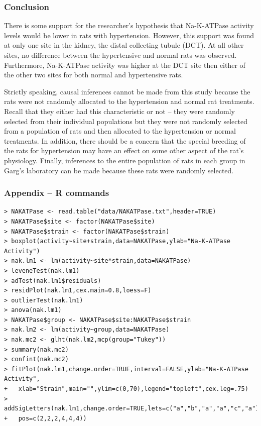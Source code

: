\documentclass[10pt,openany]{book}\usepackage[]{graphicx}\usepackage[]{color}
\begin{document}
\subsubsection*{Conclusion}
There is some support for the researcher's hypothesis that Na-K-ATPase activity levels would be lower in rats with hypertension.  However, this support was found at only one site in the kidney, the distal collecting tubule (DCT).  At all other sites, no difference between the hypertensive and normal rats was observed.  Furthermore, Na-K-ATPase activity was higher at the DCT site then either of the other two sites for both normal and hypertensive rats.

Strictly speaking, causal inferences cannot be made from this study because the rats were not randomly allocated to the hypertension and normal rat treatments.  Recall that they either had this characteristic or not -- they were randomly selected from their individual populations but they were not randomly selected from a population of rats and then allocated to the hypertension or normal treatments.  In addition, there should be a concern that the special breeding of the rats for hypertension may have an effect on some other aspect of the rat's physiology.  Finally, inferences to the entire population of rats in each group in Garg's laboratory can be made because these rats were randomly selected.

\newpage
\subsubsection*{Appendix -- R commands}
\begin{Verbatim}[formatcom=\color{red},xleftmargin=5mm,commandchars=\\\{\}]
> NAKATPase <- read.table("data/NAKATPase.txt",header=TRUE)
> NAKATPase$site <- factor(NAKATPase$site)
> NAKATPase$strain <- factor(NAKATPase$strain)
> boxplot(activity~site+strain,data=NAKATPase,ylab="Na-K-ATPase Activity")
> nak.lm1 <- lm(activity~site*strain,data=NAKATPase)
> leveneTest(nak.lm1)
> adTest(nak.lm1$residuals)
> residPlot(nak.lm1,cex.main=0.8,loess=F)
> outlierTest(nak.lm1)
> anova(nak.lm1)
> NAKATPase$group <- NAKATPase$site:NAKATPase$strain
> nak.lm2 <- lm(activity~group,data=NAKATPase)
> nak.mc2 <- glht(nak.lm2,mcp(group="Tukey"))
> summary(nak.mc2)
> confint(nak.mc2)
> fitPlot(nak.lm1,change.order=TRUE,interval=FALSE,ylab="Na-K-ATPase Activity",
+   xlab="Strain",main="",ylim=c(0,70),legend="topleft",cex.leg=.75)
> addSigLetters(nak.lm1,change.order=TRUE,lets=c("a","b","a","a","c","a"),
+   pos=c(2,2,2,4,4,4))
\end{Verbatim}
\end{document}
